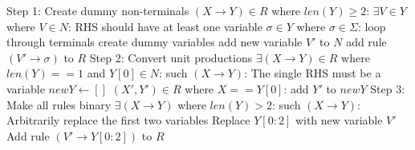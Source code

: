 \documentclass[11pt]{article}
\theoremstyle{remark}
\theoremstyle{remark}
\begin{document}
\begin{enumerate}
    \begin{codebox}
    \li \Comment Step 1: Create dummy non-terminals
    \li \For $(X\rightarrow Y) \in R$ where $len(Y) \geq 2$:
    \Do \li \If $\exists V \in Y$ where $V\in N$:
                \Then \li \Comment RHS should have at least one variable
                \li \For $\sigma \in Y$ where $\sigma \in \Sigma$:
                    \Do \li \Comment loop through terminals
                    \li \Comment create dummy variables
                    \li add new variable $V'$ to $N$
                    \li add rule $(V' \rightarrow \sigma)$ to $R$
                          \End
          \End
    \End
    \li \Comment Step 2: Convert unit productions
    \li \While $\exists (X \rightarrow Y) \in R$ where $len(Y) == 1$ and $Y[0]\in N$:
    \Do \li \For such $(X\rightarrow Y)$:
            \Do \li \Comment The single RHS must be a variable
            \li $newY \gets [ ]$
            \li \For $(X',Y') \in R$ where $X == Y[0]$:
                \Do \li add $Y'$ to $newY$
                \End
            \End
    \End
    \li \Comment Step 3: Make all rules binary
    \li \While $\exists (X\rightarrow Y)$ where $len(Y) > 2$:
    \Do \li \For such $(X\rightarrow Y)$:
            \Do \li \Comment Arbitrarily replace the first two variables
            \li Replace $Y[0:2]$ with new variable $V'$
            \li Add rule $(V'\rightarrow Y[0:2])$ to $R$
            \End
    \End
    \end{codebox}
\end{enumerate}
\end{document}
